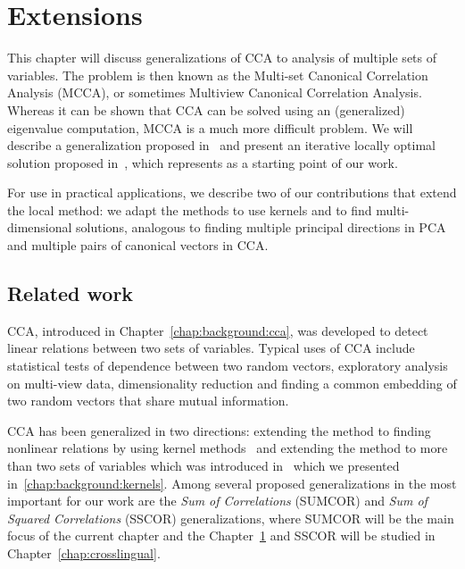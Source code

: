 %
\chapter{Extensions}\label{chap:extensions}

This chapter will discuss generalizations of CCA to
analysis of multiple sets of variables. The
problem is then known as the Multi-set Canonical Correlation Analysis
(MCCA), or sometimes Multiview Canonical Correlation Analysis.
 Whereas it can be shown that CCA can be solved using an
(generalized) eigenvalue computation, MCCA is a much more
difficult problem. We will describe a generalization
proposed in~\cite{Kettenring} and present an iterative
locally optimal solution proposed in~\cite{Horst}, which
represents as a starting point of our work.

For use in practical applications, we describe two of our contributions that
extend the local method: we adapt the methods to use kernels and to find
multi-dimensional solutions, analogous to finding multiple principal directions 
in PCA and multiple pairs of canonical vectors in CCA.

\section{Related work}\label{chap:extensions:related}
CCA, introduced in Chapter~\ref{chap:background:cca}, was developed to detect linear relations between 
two sets of variables. Typical uses of CCA include statistical tests of dependence between two random vectors, exploratory 
analysis on multi-view data, dimensionality reduction and finding a common embedding 
of two random vectors that share mutual information.

CCA has been generalized in two directions: extending the method to finding nonlinear 
relations  by using kernel methods~\cite{FBMJ}\cite{HardoonCCA} and extending the 
method to more than two sets of variables which was introduced in~\cite{Kettenring} which
we presented in~\ref{chap:background:kernels}.
Among several proposed generalizations in \cite{Kettenring} the most important for our work are the \emph{Sum 
of Correlations} (SUMCOR) and \emph{Sum of Squared Correlations} (SSCOR) generalizations, where SUMCOR
will be the main focus of the current chapter and the Chapter~\ref{chap:extensions} and SSCOR will
be studied in Chapter~\ref{chap:crosslingual}.

